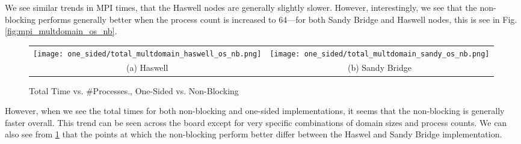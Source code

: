 \begin{enumerate}
	We see similar trends in MPI times, that the Haswell nodes are generally slightly slower. 
	However, interestingly, we see that the non-blocking performs generally better when the process count is increased to 64---for both Sandy Bridge and Haswell nodes, this is see in Fig. \ref{fig:mpi_multdomain_os_nb}.
			\begin{figure}[h] %
		\hspace*{-0.25\linewidth}\begin{tabular}{cc}
			\texttt{[image: one\_sided/total\_multdomain\_haswell\_os\_nb.png]} & \texttt{[image: one\_sided/total\_multdomain\_sandy\_os\_nb.png]} \\
			(a) Haswell &  (b) Sandy Bridge\\[6pt]
		\end{tabular}
		\caption{Total Time vs. \#Processes., One-Sided vs. Non-Blocking}
		\label{fig:total_multdomain_os_nb}
	\end{figure}
	
	However, when we see the total times for both non-blocking and one-sided implementations, it seems that the non-blocking is generally faster overall.
	This trend can be seen across the board except for very specific combinations of domain sizes and process counts. 
	We can also see from \ref{fig:total_multdomain_os_nb} that the points at which the non-blocking perform better differ between the Haswel and Sandy Bridge implementation.


\end{enumerate}
